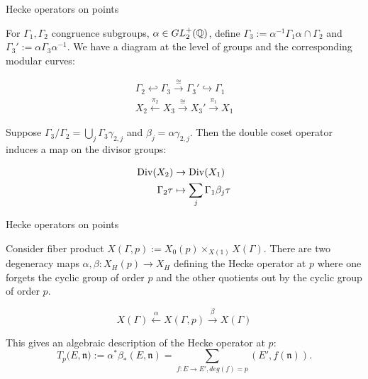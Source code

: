 \begin{frame}{Hecke operators on points}

For $\Gamma_1, \Gamma_2$ congruence subgroups, $\alpha \in GL_2^+(\mathbb{Q}) $, define $\Gamma_3 := \alpha^{-1} \Gamma_1 \alpha \cap \Gamma_2$ and $\Gamma_3' := \alpha \Gamma_3 \alpha^{-1}$. We have a diagram at the level of groups and the corresponding modular curves:

\begin{align*}
\Gamma_2 \hookleftarrow \Gamma_3 \xrightarrow{\cong} \Gamma_3' \hookrightarrow \Gamma_1 \\
X_2 \xleftarrow{\pi_2} X_3 \xrightarrow{\cong} X_3' \xrightarrow{\pi_1} X_1
\end{align*}

Suppose $\Gamma_3 / \Gamma_2 = \bigcup_j \Gamma_3 \gamma_{2,j}$ and $\beta_j = \alpha \gamma_{2,j}$. Then the double coset operator induces a map on the divisor groups:

\begin{align*}
    \operatorname{Div}(X_2) &\rightarrow \operatorname{Div}(X_1) \\
    \Gamma_2 \tau &\mapsto \sum_j \Gamma_1 \beta_j \tau
\end{align*}

\end{frame}

\begin{frame}{Hecke operators on points}

Consider fiber product $X(\Gamma, p) := X_0(p) \times_{X(1)} X(\Gamma)$. There are two degeneracy maps $\alpha,\beta: X_H(p) \rightarrow X_H$ defining the Hecke operator at $p$ where one forgets the cyclic group of order $p$ and the other quotients out by the cyclic group of order $p$.

\[
X(\Gamma) \xleftarrow{\alpha} X(\Gamma,p) \xrightarrow{\beta} X(\Gamma)
\]

This gives an algebraic description of the Hecke operator at $p$:
\[
T_p(E,\mathfrak{n)} := \alpha^* \beta_* (E,\mathfrak{n}) = \sum_{f:E\rightarrow E', deg(f) = p} (E',f(\mathfrak{n})).
\]

\end{frame}

